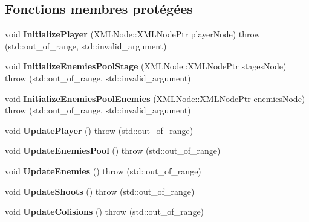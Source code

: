 \subsection*{Fonctions membres protégées}
\begin{DoxyCompactItemize}
\item 
\mbox{\label{classmy_1_1SchmupScene_a506ec8d149745caa50d29a69963c892a}} 
void {\bfseries Initialize\+Player} (X\+M\+L\+Node\+::\+X\+M\+L\+Node\+Ptr player\+Node)  throw (std\+::out\+\_\+of\+\_\+range, std\+::invalid\+\_\+argument)
\item 
\mbox{\label{classmy_1_1SchmupScene_af9c2339497a16ad8b47a4f9086e16573}} 
void {\bfseries Initialize\+Enemies\+Pool\+Stage} (X\+M\+L\+Node\+::\+X\+M\+L\+Node\+Ptr stages\+Node)  throw (std\+::out\+\_\+of\+\_\+range, std\+::invalid\+\_\+argument)
\item 
\mbox{\label{classmy_1_1SchmupScene_af3913677abc7eb40ecac75765b6f56dd}} 
void {\bfseries Initialize\+Enemies\+Pool\+Enemies} (X\+M\+L\+Node\+::\+X\+M\+L\+Node\+Ptr enemies\+Node)  throw (std\+::out\+\_\+of\+\_\+range, std\+::invalid\+\_\+argument)
\item 
\mbox{\label{classmy_1_1SchmupScene_aead67edbc6f62a0855874d78dc379b33}} 
void {\bfseries Update\+Player} ()  throw (std\+::out\+\_\+of\+\_\+range)
\item 
\mbox{\label{classmy_1_1SchmupScene_a85908a630a1592f2e205254df3711773}} 
void {\bfseries Update\+Enemies\+Pool} ()  throw (std\+::out\+\_\+of\+\_\+range)
\item 
\mbox{\label{classmy_1_1SchmupScene_a8cfeaa0a042e5fc31eb7ee1618c7304e}} 
void {\bfseries Update\+Enemies} ()  throw (std\+::out\+\_\+of\+\_\+range)
\item 
\mbox{\label{classmy_1_1SchmupScene_ab2e4aa8b57aa1acc89b8288bbdaf09c0}} 
void {\bfseries Update\+Shoots} ()  throw (std\+::out\+\_\+of\+\_\+range)
\item 
\mbox{\label{classmy_1_1SchmupScene_a209f82608e696aa84bc1e97b37d75f20}} 
void {\bfseries Update\+Colisions} ()  throw (std\+::out\+\_\+of\+\_\+range)

\end{DoxyCompactItemize}
